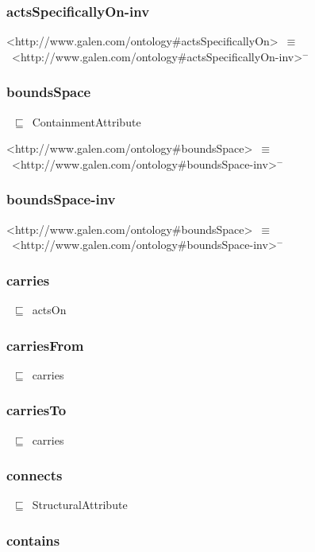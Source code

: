 \documentclass{article}
\begin{document}
\subsubsection*{actsSpecificallyOn-inv}

<http://www.galen.com/ontology#actsSpecificallyOn>~\ensuremath{\equiv}~<http://www.galen.com/ontology#actsSpecificallyOn-inv>\ensuremath{^-}

\subsubsection*{boundsSpace}

~\ensuremath{\sqsubseteq}~ContainmentAttribute

<http://www.galen.com/ontology#boundsSpace>~\ensuremath{\equiv}~<http://www.galen.com/ontology#boundsSpace-inv>\ensuremath{^-}

\subsubsection*{boundsSpace-inv}

<http://www.galen.com/ontology#boundsSpace>~\ensuremath{\equiv}~<http://www.galen.com/ontology#boundsSpace-inv>\ensuremath{^-}

\subsubsection*{carries}

~\ensuremath{\sqsubseteq}~actsOn

\subsubsection*{carriesFrom}

~\ensuremath{\sqsubseteq}~carries

\subsubsection*{carriesTo}

~\ensuremath{\sqsubseteq}~carries

\subsubsection*{connects}

~\ensuremath{\sqsubseteq}~StructuralAttribute

\subsubsection*{contains}
\end{document}
